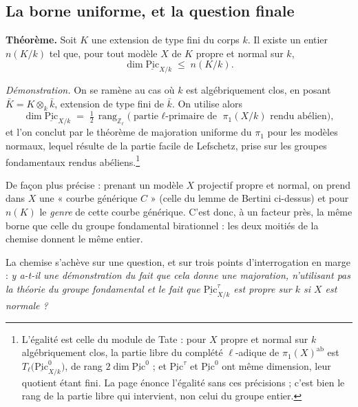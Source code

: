 \documentclass[11pt,a4paper]{article}
\begin{document}
\subsection*{La borne uniforme, et la question finale}

\textbf{Théorème.} Soit $K$ une extension de type fini du corps $k$. Il existe
un entier $n(K/k)$ tel que, pour tout modèle $X$ de $K$ propre et normal sur
$k$,
\[
  \dim \underline{\mathrm{Pic}}_{X/k} \;\leqslant\; n(K/k) .
\]

\emph{Démonstration.} On se ramène au cas où $k$ est algébriquement clos, en
posant $\bar{K} = K \otimes_{k} \bar{k}$, extension de type fini de $\bar{k}$.
On utilise alors
\[
  \dim \underline{\mathrm{Pic}}_{X/k} \;=\; \tfrac{1}{2}\,
  \operatorname{rang}_{\mathbb{Z}_{\ell}}
  \bigl(\text{partie $\ell$-primaire de } \pi_{1}(X/k) \text{ rendu
  abélien}\bigr) ,
\]
et l'on conclut par le théorème de majoration uniforme du $\pi_{1}$ pour les
modèles normaux, lequel résulte de la partie facile de Lefschetz, prise sur
les groupes fondamentaux rendus abéliens.\footnote{L'égalité est celle du
module de Tate : pour $X$ propre et normal sur $k$ algébriquement clos, la
partie libre du complété $\ell$-adique de $\pi_{1}(X)^{\mathrm{ab}}$ est
$T_{\ell}\bigl(\underline{\mathrm{Pic}}^{0}_{X/k}\bigr)$, de rang
$2\dim\underline{\mathrm{Pic}}^{0}$ ; et $\underline{\mathrm{Pic}}^{\tau}$ et
$\underline{\mathrm{Pic}}^{0}$ ont même dimension, leur quotient étant fini.
La page énonce l'égalité sans ces précisions ; c'est bien le rang de la partie
libre qui intervient, non celui du groupe entier.}

De façon plus précise : prenant un modèle $X$ projectif propre et normal, on
prend dans $X$ une « courbe générique $C$ » (celle du lemme de Bertini
ci-dessus) et pour $n(K)$ le \emph{genre} de cette courbe générique. C'est
donc, à un facteur près, la même borne que celle du groupe fondamental
birationnel : les deux moitiés de la chemise donnent le même entier.


La chemise s'achève sur une question, et sur trois points d'interrogation en
marge : \emph{y a-t-il une démonstration du fait que cela donne une majoration,
n'utilisant pas la théorie du groupe fondamental et le fait que
$\underline{\mathrm{Pic}}^{\tau}_{X/k}$ est propre sur $k$ si $X$ est normale ?}
\end{document}
